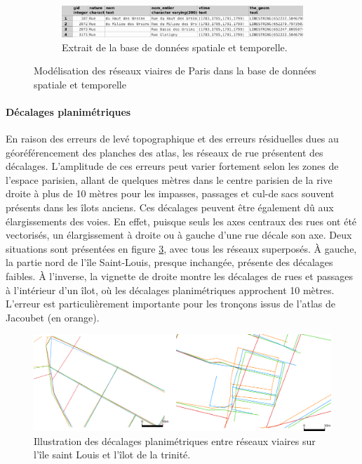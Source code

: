 \documentclass[a4paper,12pt]{article}
\begin{document}
\begin{figure}[H]
        \\
        \begin{subfigure}[b]{1\textwidth}
                \includegraphics[width=\textwidth]{./images/extract_bd_vern.png}
                \caption{Extrait de la base de données spatiale et temporelle.}
                \label{fig:extract_snap}
        \end{subfigure}
        \label{fig:troncons}
	    \caption{Modélisation des réseaux viaires de Paris dans la base de données spatiale et temporelle}
\end{figure}

\paragraph{Décalages planimétriques}
En raison des erreurs de levé topographique et des erreurs résiduelles dues au géoréférencement des planches des atlas, les réseaux de rue présentent des décalages. L'amplitude de ces erreurs peut varier fortement selon les zones de l'espace parisien, allant de quelques mètres dans le centre parisien de la rive droite à plus de 10 mètres pour les impasses, passages et cul-de sacs souvent présents dans les îlots anciens. Ces décalages peuvent être également dû aux élargissements des voies. En effet, puisque seuls les axes centraux des rues ont été vectorisés, un élargissement à droite ou à gauche d'une rue décale son axe. Deux situations sont présentées en figure \ref{fig:extrait_decalage}, avec tous les réseaux superposés. À gauche, la partie nord de l'île Saint-Louis, presque inchangée, présente des décalages faibles. À l'inverse, la vignette de droite montre les décalages de rues et passages à l'intérieur d'un îlot, où les décalages planimétriques approchent 10 mètres. L'erreur est particulièrement importante pour les tronçons issus de l'atlas de Jacoubet (en orange).

\begin{figure}
\includegraphics[width=1\textwidth]{./images/ex_decalages.png}
\caption{Illustration des décalages planimétriques entre réseaux viaires sur l'île saint Louis et l'îlot de la trinité.}
\label{fig:extrait_decalage}
\end{figure}
\end{document}

